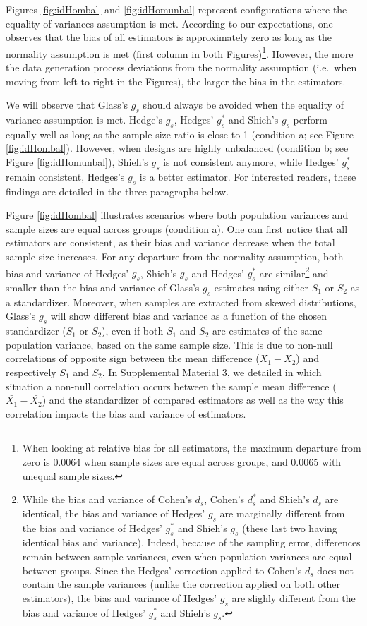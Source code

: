 \documentclass[
  english,
  man,floatsintext]{apa6}
\begin{document}
Figures \ref{fig:idHombal} and \ref{fig:idHomunbal} represent configurations where the equality of variances assumption is met. According to our expectations, one observes that the bias of all estimators is approximately zero as long as the normality assumption is met (first column in both Figures)\footnote{When looking at relative bias for all estimators, the maximum departure from zero is 0.0064 when sample sizes are equal across groups, and 0.0065 with unequal sample sizes.}. However, the more the data generation process deviations from the normality assumption (i.e.~when moving from left to right in the Figures), the larger the bias in the estimators.

We will observe that Glass's \(g_s\) should always be avoided when the equality of variance assumption is met. Hedge's \(g_s\), Hedges' \(g^*_s\) and Shieh's \(g_s\) perform equally well as long as the sample size ratio is close to 1 (condition a; see Figure \ref{fig:idHombal}). However, when designs are highly unbalanced (condition b; see Figure \ref{fig:idHomunbal}), Shieh's \(g_s\) is not consistent anymore, while Hedges' \(g^*_s\) remain consistent, Hedges's \(g_s\) is a better estimator. For interested readers, these findings are detailed in the three paragraphs below.

Figure \ref{fig:idHombal} illustrates scenarios where both population variances and sample sizes are equal across groups (condition a). One can first notice that all estimators are consistent, as their bias and variance decrease when the total sample size increases. For any departure from the normality assumption, both bias and variance of Hedges' \(g_s\), Shieh's \(g_s\) and Hedges' \(g^*_s\) are similar\footnote{While the bias and variance of Cohen's $d_s$, Cohen's $d^*_s$ and Shieh's $d_s$ are identical, the bias and variance of Hedges' $g_s$ are marginally different from the bias and variance of Hedges' $g^*_s$ and Shieh's $g_s$ (these last two having identical bias and variance). Indeed, because of the sampling error, differences remain between sample variances, even when population variances are equal between groups. Since the Hedges' correction applied to Cohen's $d_s$ does not contain the sample variances (unlike the correction applied on both other estimators), the bias and variance of Hedges' $g_s$ are slighly different from the bias and variance of Hedges' $g^*_s$ and Shieh's $g_s$.} and smaller than the bias and variance of Glass's \(g_s\) estimates using either \(S_1\) or \(S_2\) as a standardizer. Moreover, when samples are extracted from skewed distributions, Glass's \(g_s\) will show different bias and variance as a function of the chosen standardizer (\(S_1\) or \(S_2\)), even if both \(S_1\) and \(S_2\) are estimates of the same population variance, based on the same sample size. This is due to non-null correlations of opposite sign between the mean difference (\(\bar{X_1}-\bar{X_2}\)) and respectively \(S_1\) and \(S_2\). In Supplemental Material 3, we detailed in which situation a non-null correlation occurs between the sample mean difference (\(\bar{X_1}-\bar{X_2}\)) and the standardizer of compared estimators as well as the way this correlation impacts the bias and variance of estimators.
\end{document}
